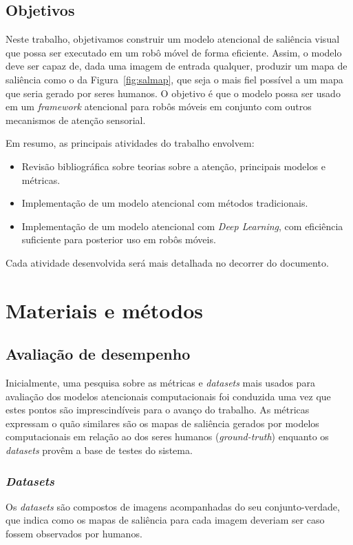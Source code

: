 \documentclass[11pt]{article}
\newcommand{\tit}[1]{\textit{#1}}
\begin{document}
\subsection{Objetivos}
Neste trabalho, objetivamos construir um modelo atencional de saliência visual que possa ser executado em um robô móvel de forma eficiente. Assim, o modelo deve ser capaz de, dada uma imagem de entrada qualquer,
produzir um mapa de saliência como o da Figura~\ref{fig:salmap}, que seja
o mais fiel possível a um mapa que seria gerado por seres humanos.
O objetivo é que o modelo possa ser usado em um \tit{framework} atencional
para robôs móveis em conjunto com outros mecanismos de atenção sensorial.

Em resumo, as principais atividades do trabalho envolvem:
\begin{itemize}
    \item Revisão bibliográfica sobre teorias sobre a atenção, principais modelos e métricas.
    \item Implementação de um modelo atencional com métodos tradicionais.
    \item Implementação de um modelo atencional com \tit{Deep Learning}, com
        eficiência suficiente para posterior uso em robôs móveis.
\end{itemize}

Cada atividade desenvolvida será mais detalhada no decorrer do documento.

\section{Materiais e métodos}

\subsection{Avaliação de desempenho}
Inicialmente, uma pesquisa sobre as métricas e \tit{datasets} mais usados para
avaliação dos modelos atencionais computacionais foi conduzida uma vez que estes pontos são imprescindíveis  para o avanço do trabalho. As métricas expressam o quão similares são os mapas de saliência gerados
por modelos computacionais em relação ao dos seres humanos (\tit{ground-truth}) enquanto os \emph{datasets} provêm a base de testes do sistema.

\subsubsection{\tit{Datasets}}
Os \tit{datasets} são compostos de imagens acompanhadas do seu conjunto-verdade,
que indica como os mapas de saliência para cada imagem deveriam ser caso fossem observados por humanos.
\end{document}
